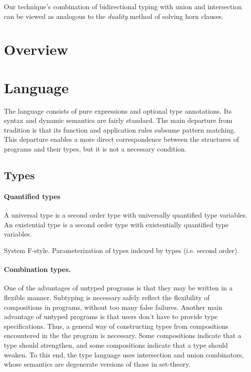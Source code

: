 \documentclass[sigplan,screen,review]{acmart}
\begin{document}
Our technique's combination of bidirectional typing with union and intersection can be viewed as analogous to the \textit{duality} method
of solving horn clauses.


\section{Overview}



\section{Language}
The language consists of pure expressions and optional type annotations. 
Its syntax and dynamic semantics 
are fairly standard. The main departure from tradition is that its function
and application rules subsume pattern matching. This departure enables a more direct  
correspondence between the structures of programs and their types, but it is 
not a necessary condition.

\subsection{Types}

\paragraph{Quantified types}
A universal type is a second order type with universally quantified type variables. 
An existential type is a second order type with existentially quantified type variables. 

System F-style. Parameterization of types indexed by types (i.e. second order).


\paragraph{Combination types.}
One of the advantages of untyped programs is that they may be written in a flexible manner.
Subtyping is necessary safely reflect the flexibility of compositions in programs, without too many false failures.
Another main advantage of untyped programs is that users don't have to provide type specifications.
Thus, a general way of constructing types from compositions encountered in the the program is necessary.
Some compositions indicate that a type should strengthen, and some compositions indicate that a type should weaken.
To this end, the type language uses intersection and union combinators, 
whose semantics are degenerate versions of those in set-theory.
\end{document}
